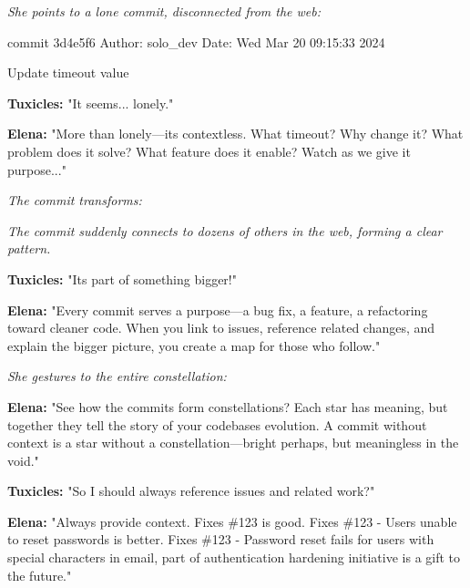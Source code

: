 \emph{She points to a lone commit, disconnected from the web:}

\begin{codeblock}
commit 3d4e5f6
Author: solo_dev
Date: Wed Mar 20 09:15:33 2024  

Update timeout value
\end{codeblock}

\textbf{Tuxicles:} "It seems... lonely."

\textbf{Elena:} "More than lonely---it\textquotesingle s contextless. What timeout? Why change it? What problem does it solve? What feature does it enable? Watch as we give it purpose..."

\emph{The commit transforms:}


\emph{The commit suddenly connects to dozens of others in the web, forming a clear pattern.}

\textbf{Tuxicles:} "It\textquotesingle s part of something bigger!"

\textbf{Elena:} "Every commit serves a purpose---a bug fix, a feature, a refactoring toward cleaner code. When you link to issues, reference related changes, and explain the bigger picture, you create a map for those who follow."

\emph{She gestures to the entire constellation:}

\textbf{Elena:} "See how the commits form constellations? Each star has meaning, but together they tell the story of your codebase\textquotesingle s evolution. A commit without context is a star without a constellation---bright perhaps, but meaningless in the void."

\textbf{Tuxicles:} "So I should always reference issues and related work?"

\textbf{Elena:} "Always provide context. \textquotesingle Fixes \#123\textquotesingle{} is good. \textquotesingle Fixes \#123 - Users unable to reset passwords\textquotesingle{} is better. \textquotesingle Fixes \#123 - Password reset fails for users with special characters in email, part of authentication hardening initiative\textquotesingle{} is a gift to the future."

